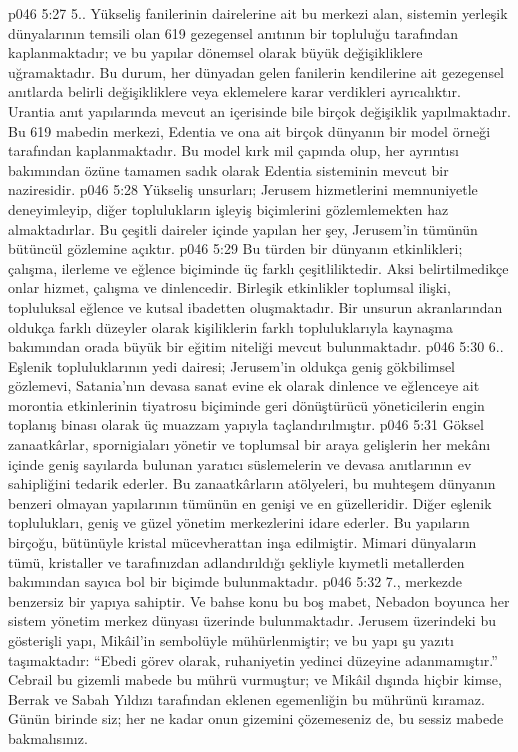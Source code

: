 \vs p046 5:27 5.\bibnobreakspace {}. Yükseliş fanilerinin dairelerine ait bu merkezi alan, sistemin yerleşik dünyalarının temsili olan 619 gezegensel anıtının bir topluluğu tarafından kaplanmaktadır; ve bu yapılar dönemsel olarak büyük değişikliklere uğramaktadır. Bu durum, her dünyadan gelen fanilerin kendilerine ait gezegensel anıtlarda belirli değişikliklere veya eklemelere karar verdikleri ayrıcalıktır. Urantia anıt yapılarında mevcut an içerisinde bile birçok değişiklik yapılmaktadır. Bu 619 mabedin merkezi, Edentia ve ona ait birçok dünyanın bir model örneği tarafından kaplanmaktadır. Bu model kırk mil çapında olup, her ayrıntısı bakımından özüne tamamen sadık olarak Edentia sisteminin mevcut bir naziresidir.
\vs p046 5:28 Yükseliş unsurları; Jerusem hizmetlerini memnuniyetle deneyimleyip, diğer toplulukların işleyiş biçimlerini gözlemlemekten haz almaktadırlar. Bu çeşitli daireler içinde yapılan her şey, Jerusem’in tümünün bütüncül gözlemine açıktır.
\vs p046 5:29 Bu türden bir dünyanın etkinlikleri; çalışma, ilerleme ve eğlence biçiminde üç farklı çeşitliliktedir. Aksi belirtilmedikçe onlar hizmet, çalışma ve dinlencedir. Birleşik etkinlikler toplumsal ilişki, topluluksal eğlence ve kutsal ibadetten oluşmaktadır. Bir unsurun akranlarından oldukça farklı düzeyler olarak kişiliklerin farklı topluluklarıyla kaynaşma bakımından orada büyük bir eğitim niteliği mevcut bulunmaktadır.
\vs p046 5:30 6.\bibnobreakspace {}. Eşlenik topluluklarının yedi dairesi; Jerusem’in oldukça geniş gökbilimsel gözlemevi, Satania’nın devasa sanat evine ek olarak dinlence ve eğlenceye ait morontia etkinlerinin tiyatrosu biçiminde geri dönüştürücü yöneticilerin engin toplanış binası olarak üç muazzam yapıyla taçlandırılmıştır.
\vs p046 5:31 Göksel zanaatkârlar, spornigiaları yönetir ve toplumsal bir araya gelişlerin her mekânı içinde geniş sayılarda bulunan yaratıcı süslemelerin ve devasa anıtlarının ev sahipliğini tedarik ederler. Bu zanaatkârların atölyeleri, bu muhteşem dünyanın benzeri olmayan yapılarının tümünün en genişi ve en güzelleridir. Diğer eşlenik toplulukları, geniş ve güzel yönetim merkezlerini idare ederler. Bu yapıların birçoğu, bütünüyle kristal mücevherattan inşa edilmiştir. Mimari dünyaların tümü, kristaller ve tarafınızdan adlandırıldığı şekliyle kıymetli metallerden bakımından sayıca bol bir biçimde bulunmaktadır.
\vs p046 5:32 7.\bibnobreakspace {}, merkezde benzersiz bir yapıya sahiptir. Ve bahse konu bu boş mabet, Nebadon boyunca her sistem yönetim merkez dünyası üzerinde bulunmaktadır. Jerusem üzerindeki bu gösterişli yapı, Mikâil’in sembolüyle mühürlenmiştir; ve bu yapı şu yazıtı taşımaktadır: “Ebedi görev olarak, ruhaniyetin yedinci düzeyine adanmamıştır.” Cebrail bu gizemli mabede bu mührü vurmuştur; ve Mikâil dışında hiçbir kimse, Berrak ve Sabah Yıldızı tarafından eklenen egemenliğin bu mührünü kıramaz. Günün birinde siz; her ne kadar onun gizemini çözemeseniz de, bu sessiz mabede bakmalısınız.
